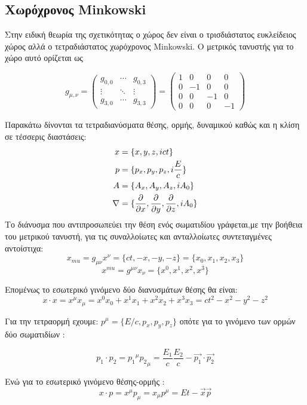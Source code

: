 \subsection{Χωρόχρονος \textlatin{Minkowski}}

Στην ειδική θεωρία της σχετικότητας ο χώρος δεν είναι ο τρισδιάστατος ευκλείδειος χώρος αλλά 
ο τετραδιάστατος χωρόχρονος \textlatin{Minkowski}. Ο μετρικός τανυστής για το χώρο αυτό ορίζεται ως 

\[
  g_{\mu,\nu} =
  \begin{pmatrix}
    g_{0,0}  & \cdots & g_{0,3} \\
    \vdots & \ddots & \vdots \\
    g_{3,0}  & \cdots & g_{3,3}
  \end{pmatrix}
  =
  \begin{pmatrix}
    1 & 0 & 0 & 0 \\
    0 & -1 & 0 & 0 \\
    0 & 0 & -1 & 0 \\
    0 & 0 & 0 &-1
  \end{pmatrix}
\]

Παρακάτω δίνονται τα τετραδιανύσματα θέσης, ορμής, δυναμικού καθώς και η κλίση σε τέσσερις διαστάσεις:
\begin{align*} 
  x &=\{x,y,z,ict\} 
  \\p &=\{p_x,p_y,p_z,i\frac{E}{c}\}
  \\A &=\{A_x,A_y,A_z,iA_0\}
  \\ \nabla &= \{\frac{\partial }{\partial x},\frac{\partial }{\partial y},\frac{\partial }{\partial z},iA_0\}
\end{align*} 
Το διάνυσμα που αντιπροσωπεύει την θέση ενός σωματιδίου γράφεται,με την βοήθεια του μετρικού τανυστή, για τις συναλλοίωτες και ανταλλοίωτες συντεταγμένες αντοίστιχα: 
\[
x_{mu}=g_{\mu \nu} x^\nu= \{ct,-x,-y,-z\}=\{x_0,x_1,x_2,x_3\}
\]
\[
x^{mu}=g^{\mu \nu} x_\nu= \{x^0,x^1,x^2,x^3\}
\]

Επομένως το εσωτερικό γινόμενο δύο διανυσμάτων θέσης θα είναι:
\[
  x \cdot x =x^\mu x_\mu =x^0 x_0 + x^1 x_1 + x^2 x_2 +x^3 x_3 = ct^2 -x^2-y^2-z^2  
\]

Για την τετραορμή εχουμε: $p^\mu =\{E/c,p_x,p_y,p_z\} $ οπότε για το γινόμενο των ορμών δύο σωματιδίων :

\begin{equation}
  p_1 \cdot p_2 = {p_1}^\mu {p_2}_\mu=\frac{E_1}{c} \frac{E_2}{c}-\vec{p_1}\cdot \vec{p_2} 
  \label{genrel2}
\end{equation}

Ενώ για το εσωτερικό γινόμενο θέσης-ορμής : 
\[
  x\cdot p= x^\mu p_\mu =x_\mu p^\mu= Et-\vec{x}\vec{p}
\]

